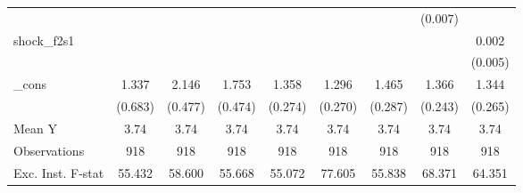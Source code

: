 {\begin{tabular}{l*{8}{c}}
            &                     &                     &                     &                     &                     &                     &     (0.007)         &                     \\
\addlinespace
shock\_f2s1  &                     &                     &                     &                     &                     &                     &                     &       0.002         \\
            &                     &                     &                     &                     &                     &                     &                     &     (0.005)         \\
\addlinespace
\_cons      &       1.337\sym{*}  &       2.146\sym{***}&       1.753\sym{***}&       1.358\sym{***}&       1.296\sym{***}&       1.465\sym{***}&       1.366\sym{***}&       1.344\sym{***}\\
            &     (0.683)         &     (0.477)         &     (0.474)         &     (0.274)         &     (0.270)         &     (0.287)         &     (0.243)         &     (0.265)         \\
\midrule
Mean Y      &        3.74         &        3.74         &        3.74         &        3.74         &        3.74         &        3.74         &        3.74         &        3.74         \\
Observations&         918         &         918         &         918         &         918         &         918         &         918         &         918         &         918         \\
Exc. Inst. F-stat&      55.432         &      58.600         &      55.668         &      55.072         &      77.605         &      55.838         &      68.371         &      64.351         \\
\bottomrule
\end{tabular}
}
